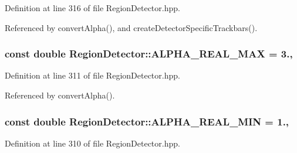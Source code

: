 Definition at line 316 of file Region\-Detector.\-hpp.



Referenced by convert\-Alpha(), and create\-Detector\-Specific\-Trackbars().

\hypertarget{classmultiscale_1_1analysis_1_1RegionDetector_abc853d2cfef9e4fafbf86715b48495e0}{
\subsubsection[{A\-L\-P\-H\-A\-\_\-\-R\-E\-A\-L\-\_\-\-M\-A\-X}]{\setlength{\rightskip}{0pt plus 5cm}const double Region\-Detector\-::\-A\-L\-P\-H\-A\-\_\-\-R\-E\-A\-L\-\_\-\-M\-A\-X = 3.\hspace{0.3cm}{\ttfamily [static]}, {\ttfamily [private]}}}\label{classmultiscale_1_1analysis_1_1RegionDetector_abc853d2cfef9e4fafbf86715b48495e0}


Definition at line 311 of file Region\-Detector.\-hpp.



Referenced by convert\-Alpha().

\hypertarget{classmultiscale_1_1analysis_1_1RegionDetector_a4a11aa86a5250ca6197589c4ccb770f6}{
\subsubsection[{A\-L\-P\-H\-A\-\_\-\-R\-E\-A\-L\-\_\-\-M\-I\-N}]{\setlength{\rightskip}{0pt plus 5cm}const double Region\-Detector\-::\-A\-L\-P\-H\-A\-\_\-\-R\-E\-A\-L\-\_\-\-M\-I\-N = 1.\hspace{0.3cm}{\ttfamily [static]}, {\ttfamily [private]}}}\label{classmultiscale_1_1analysis_1_1RegionDetector_a4a11aa86a5250ca6197589c4ccb770f6}


Definition at line 310 of file Region\-Detector.\-hpp.



